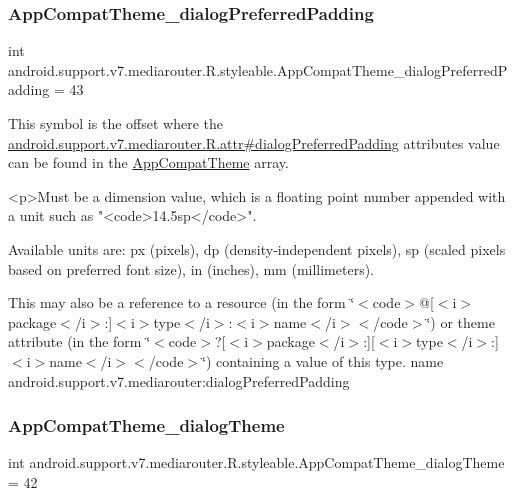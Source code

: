 \subsubsection{\texorpdfstring{App\+Compat\+Theme\+\_\+dialog\+Preferred\+Padding}{AppCompatTheme\_dialogPreferredPadding}}
{\footnotesize\ttfamily int android.\+support.\+v7.\+mediarouter.\+R.\+styleable.\+App\+Compat\+Theme\+\_\+dialog\+Preferred\+Padding = 43\hspace{0.3cm}{\ttfamily [static]}}

This symbol is the offset where the \hyperlink{classandroid_1_1support_1_1v7_1_1mediarouter_1_1R_1_1attr_adafd11447e4528712df28c762b51f02d}{android.\+support.\+v7.\+mediarouter.\+R.\+attr\#dialog\+Preferred\+Padding} attribute\textquotesingle{}s value can be found in the \hyperlink{classandroid_1_1support_1_1v7_1_1mediarouter_1_1R_1_1styleable_a4e3d3900c75d49aeb2f283cac00214d6}{App\+Compat\+Theme} array.

\begin{DoxyVerb}      <p>Must be a dimension value, which is a floating point number appended with a unit such as "<code>14.5sp</code>".
\end{DoxyVerb}
 Available units are\+: px (pixels), dp (density-\/independent pixels), sp (scaled pixels based on preferred font size), in (inches), mm (millimeters). 

This may also be a reference to a resource (in the form \char`\"{}$<$code$>$@\mbox{[}$<$i$>$package$<$/i$>$\+:\mbox{]}$<$i$>$type$<$/i$>$\+:$<$i$>$name$<$/i$>$$<$/code$>$\char`\"{}) or theme attribute (in the form \char`\"{}$<$code$>$?\mbox{[}$<$i$>$package$<$/i$>$\+:\mbox{]}\mbox{[}$<$i$>$type$<$/i$>$\+:\mbox{]}$<$i$>$name$<$/i$>$$<$/code$>$\char`\"{}) containing a value of this type.  name android.\+support.\+v7.\+mediarouter\+:dialog\+Preferred\+Padding \mbox{\label{classandroid_1_1support_1_1v7_1_1mediarouter_1_1R_1_1styleable_ae5022810b719a59e28a020ed0d2689d1}} 
\subsubsection{\texorpdfstring{App\+Compat\+Theme\+\_\+dialog\+Theme}{AppCompatTheme\_dialogTheme}}
{\footnotesize\ttfamily int android.\+support.\+v7.\+mediarouter.\+R.\+styleable.\+App\+Compat\+Theme\+\_\+dialog\+Theme = 42\hspace{0.3cm}{\ttfamily [static]}}


